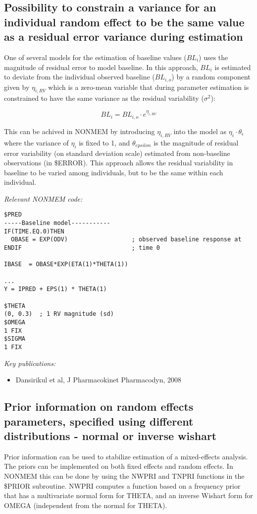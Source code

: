 \documentclass[a4paper,11pt]{article}
\begin{document}
\subsection{Possibility to constrain a variance for an individual
  random effect to be the same value as a residual error variance
  during estimation}

One of several models for the estimation of baseline values ($BL_i$)
uses the magnitude of residual error to model baseline. In this
approach, $BL_i$ is estimated to deviate from the individual observed
baseline ($BL_{i,o}$) by a random component given by $\eta_{i,RV}$ which
is a zero-mean variable that during parameter estimation is
constrained to have the same variance as the residual variability ($\sigma^2$):

\begin{equation}
BL_i = BL_{i,o} \cdot e^{\eta_{i,RV}}
\end{equation}

This can be achived in NONMEM by introducing $\eta_{i,RV}$ into the
model as $\eta_{i}\cdot \theta_\epsilon$ where the variance of
$\eta_i$ is fixed to 1, and $\theta_{epsilon}$ is the magnitude of
residual error variability (on standard deviation scale) estimated
from non-baseline observations (in \$ERROR). This approach allows the
residual variability in baseline to be varied among individuals, but
to be the same within each individual.

\vspace{10pt}
\noindent \emph{Relevant NONMEM code:}
\begin{lstlisting}
$PRED
-----Baseline model-----------
IF(TIME.EQ.0)THEN  
  OBASE = EXP(ODV)                  ; observed baseline response at
ENDIF                               ; time 0

IBASE  = OBASE*EXP(ETA(1)*THETA(1)) 

...
Y = IPRED + EPS(1) * THETA(1)

$THETA
(0, 0.3)  ; 1 RV magnitude (sd)
$OMEGA
1 FIX 
$SIGMA
1 FIX
\end{lstlisting}

\noindent \emph{Key publications:}
\begin{itemize}
\item Dansirikul et al, J Pharmacokinet Pharmacodyn, 2008
\end{itemize}

\subsection{Prior information on random effects parameters, specified
  using different distributions - normal or inverse wishart}
Prior information can be used to stabilize estimation of a
mixed-effects analysis. The priors can be implemented on both fixed
effects and random effects. In NONMEM this can be done by using the
NWPRI and TNPRI functions in the \$PRIOR subroutine. NWPRI computes a
function based on a frequency prior that has a multivariate normal
form for THETA, and an inverse Wishart form for OMEGA (independent
from the normal for THETA). 
\end{document}
